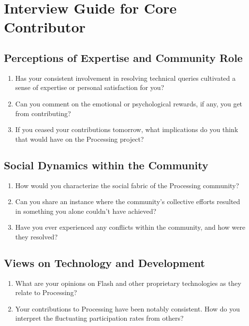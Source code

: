 \section*{Interview Guide for Core Contributor}

\subsection*{Perceptions of Expertise and Community Role}

\begin{enumerate}
    \item Has your consistent involvement in resolving technical queries cultivated a sense of expertise or personal satisfaction for you?
    \item Can you comment on the emotional or psychological rewards, if any, you get from contributing?
    \item If you ceased your contributions tomorrow, what implications do you think that would have on the Processing project?
\end{enumerate}

\subsection*{Social Dynamics within the Community}

\begin{enumerate}[resume]
    \item How would you characterize the social fabric of the Processing community?
    \item Can you share an instance where the community's collective efforts resulted in something you alone couldn't have achieved?
    \item Have you ever experienced any conflicts within the community, and how were they resolved?
\end{enumerate}

\subsection*{Views on Technology and Development}

\begin{enumerate}[resume]
    \item What are your opinions on Flash and other proprietary technologies as they relate to Processing?
    \item Your contributions to Processing have been notably consistent. How do you interpret the fluctuating participation rates from others?
\end{enumerate}

